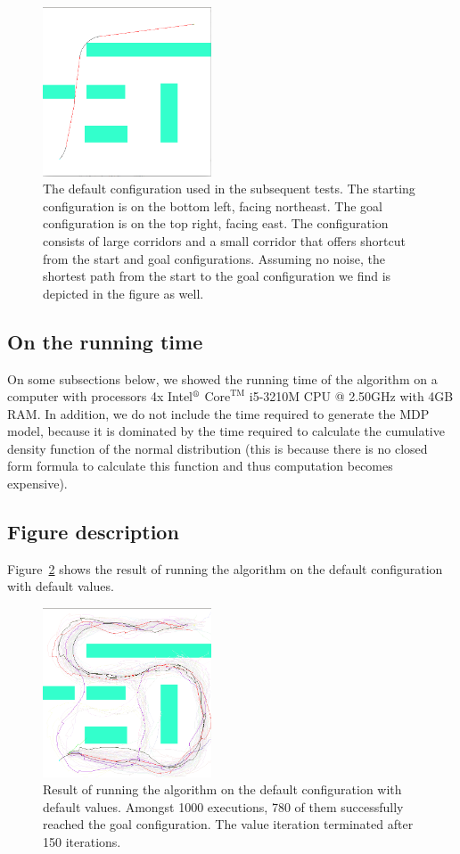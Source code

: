 \documentclass[a4paper]{article}
\begin{document}
\begin{figure}
\caption{The default configuration used in the subsequent tests. The starting
  configuration is on the bottom left, facing northeast. The goal configuration
  is on the top right, facing east. The configuration consists
  of large corridors and a small corridor that offers shortcut from the start
  and goal configurations. Assuming no noise, the shortest path from the start
to the goal configuration we find is depicted in the figure as well.}
\label{f:b_shortest}
\centerline{\includegraphics[width=5cm]{b_shortest.png}}
\end{figure}

\subsection{On the running time}
On some subsections below, we showed the running time of the algorithm on
a computer with processors 4x Intel$^\text{\textregistered}$ $\text{Core}^{\text{TM}}$ i5-3210M CPU @ 2.50GHz with 4GB RAM. In addition, we do not
include the time required to generate the MDP model, because it is dominated
by the time required to calculate the cumulative density function of the
normal distribution (this is because there is no closed form formula to
calculate this function and thus computation becomes expensive).

\subsection{Figure description}
Figure~\ref{f:b} shows the result of running the algorithm on the default
configuration with default values.

\begin{figure}
\caption{Result of running the algorithm on the default configuration with default values.
Amongst 1000 executions, 780 of them successfully reached the goal configuration.
The value iteration terminated after 150 iterations.}
\label{f:b}
\centerline{\includegraphics[width=5cm]{b.png}}
\end{figure}
\end{document}
